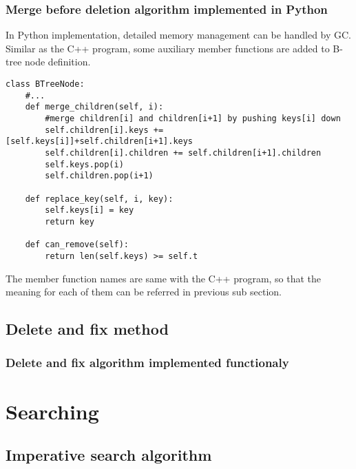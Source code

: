 \documentclass{article}
\begin{document}
\subsubsection{Merge before deletion algorithm implemented in Python}
In Python implementation, detailed memory management can be handled by
GC. Similar as the C++ program, some auxiliary member functions
are added to B-tree node definition.

\lstset{language=Python}
\begin{lstlisting}
class BTreeNode:
    #...
    def merge_children(self, i):
        #merge children[i] and children[i+1] by pushing keys[i] down
        self.children[i].keys += [self.keys[i]]+self.children[i+1].keys
        self.children[i].children += self.children[i+1].children
        self.keys.pop(i)
        self.children.pop(i+1)

    def replace_key(self, i, key):
        self.keys[i] = key
        return key

    def can_remove(self):
        return len(self.keys) >= self.t
\end{lstlisting}

The member function names are same with the C++ program, so that the
meaning for each of them can be referred in previous sub section.


\subsection{Delete and fix method}

\subsubsection{Delete and fix algorithm implemented functionaly}

\section{Searching} 

\subsection{Imperative search algorithm}
\end{document}

